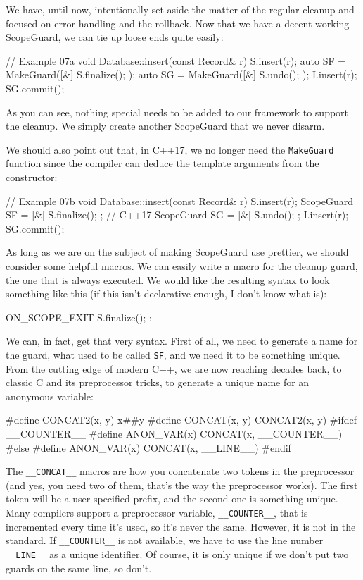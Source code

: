 We have, until now, intentionally set aside the matter of the regular cleanup and focused on error handling and the rollback. Now that we have a decent working ScopeGuard, we can tie up loose ends quite easily:

\begin{code}
// Example 07a
void Database::insert(const Record& r) {
  S.insert(r);
  auto SF = MakeGuard([&] { S.finalize(); });
  auto SG = MakeGuard([&] { S.undo(); });
  I.insert(r);
  SG.commit();
}
\end{code}

As you can see, nothing special needs to be added to our framework to support the cleanup. We simply create another ScopeGuard that we never disarm.

We should also point out that, in C++17, we no longer need the \texttt{MakeGuard} function since the compiler can deduce the template arguments from the constructor:

\begin{code}
// Example 07b
void Database::insert(const Record& r) {
  S.insert(r);
  ScopeGuard SF = [&] { S.finalize(); };    // C++17
  ScopeGuard SG = [&] { S.undo(); };
  I.insert(r);
  SG.commit();
}
\end{code}

As long as we are on the subject of making ScopeGuard use prettier, we should consider some helpful macros. We can easily write a macro for the cleanup guard, the one that is always executed. We would like the resulting syntax to look something like this (if this isn't declarative enough, I don't know what is):

\begin{code}
ON_SCOPE_EXIT { S.finalize(); };
\end{code}

We can, in fact, get that very syntax. First of all, we need to generate a name for the guard, what used to be called \texttt{SF}, and we need it to be something unique. From the cutting edge of modern C++, we are now reaching decades back, to classic C and its preprocessor tricks, to generate a unique name for an anonymous variable:

\begin{code}
#define CONCAT2(x, y) x##y
#define CONCAT(x, y) CONCAT2(x, y)
#ifdef __COUNTER__
#define ANON_VAR(x) CONCAT(x, __COUNTER__)
#else
#define ANON_VAR(x) CONCAT(x, __LINE__)
#endif
\end{code}

The \texttt{\_\_CONCAT\_\_} macros are how you concatenate two tokens in the preprocessor (and yes, you need two of them, that's the way the preprocessor works). The first token will be a user-specified prefix, and the second one is something unique. Many compilers support a preprocessor variable, \texttt{\_\_COUNTER\_\_}, that is incremented every time it's used, so it's never the same. However, it is not in the standard. If \texttt{\_\_COUNTER\_\_} is not available, we have to use the line number \texttt{\_\_LINE\_\_} as a unique identifier. Of course, it is only unique if we don't put two guards on the same line, so don't.

